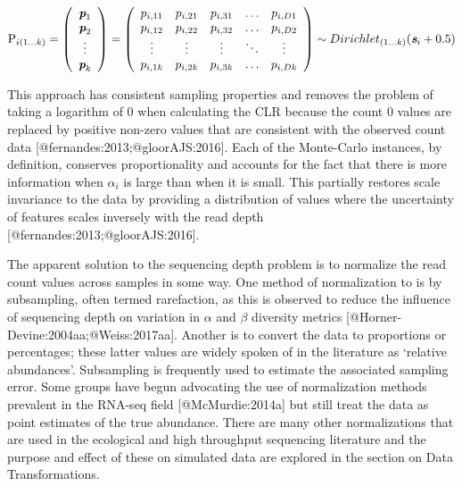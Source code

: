 \documentclass[
  onecolumn]{article}
\begin{document}
\parbox[b]{7in}{
\begin{equation}
\textrm{P}_{i (1 \ldots k)}=
\left( \begin{array}{c}
    \textit{\textbf{p}}_1 \\
   \textit{\textbf{p}}_2 \\
    \vdots \\
    \textit{\textbf{p}}_k \\
\end{array} \right)=
\left( \begin{array}{ccccc}
    p_{i,11} & p_{i,21} & p_{i,31} & \dots  & p_{i,D1} \\
    p_{i,12} & p_{i,22} & p_{i,32} & \dots  & p_{i,D2} \\
    \vdots & \vdots & \vdots & \ddots & \vdots \\
    p_{i,1k} & p_{i,2k} & p_{i,3k} & \dots  & p_{i,Dk}\\
\end{array} \right)
\sim Dirichlet_{(1 \ldots k)}(\textit{\textbf{s}}_i + 0.5)
\label{eq:matrix}
\end{equation}
}

This approach has consistent sampling properties and removes the problem of taking a logarithm of 0 when calculating the CLR because the count 0 values are replaced by positive non-zero values that are consistent with the observed count data {[}@fernandes:2013;@gloorAJS:2016{]}. Each of the Monte-Carlo instances, by definition, conserves proportionality and accounts for the fact that there is more information when \(\alpha_i\) is large than when it is small. This partially restores scale invariance to the data by providing a distribution of values where the uncertainty of features scales inversely with the read depth {[}@fernandes:2013;@gloorAJS:2016{]}.

The apparent solution to the sequencing depth problem is to normalize the read count values across samples in some way. One method of normalization to is by subsampling, often termed rarefaction, as this is observed to reduce the influence of sequencing depth on variation in \(\alpha\) and \(\beta\) diversity metrics {[}@Horner-Devine:2004aa;@Weiss:2017aa{]}. Another is to convert the data to proportions or percentages; these latter values are widely spoken of in the literature as `relative abundances'. Subsampling is frequently used to estimate the associated sampling error. Some groups have begun advocating the use of normalization methods prevalent in the RNA-seq field {[}@McMurdie:2014a{]} but still treat the data as point estimates of the true abundance. There are many other normalizations that are used in the ecological and high throughput sequencing literature and the purpose and effect of these on simulated data are explored in the section on Data Transformations.
\end{document}
